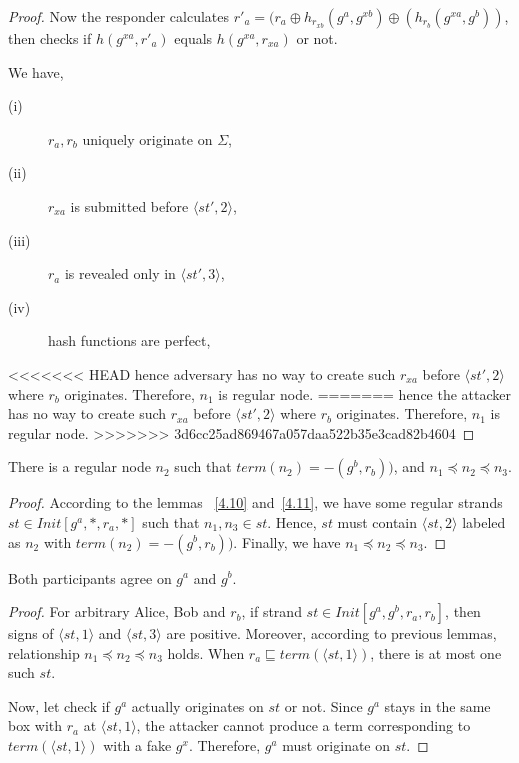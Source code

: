 \begin{itemize}
\begin{proof}
Now the responder calculates $r'_{a} = (r_a \oplus h_{r_{xb}}(g^a,g^{xb}) \oplus (h_{r_b}(g^{xa},g^b))$, then checks if $h(g^{xa},r'_{a})$ equals $h(g^{xa},r_{xa})$ or not. 

We have,
\begin{description} 
 \item [(i)] $r_a, r_b$ uniquely originate on $\Sigma$, 
 \item [(ii)] $r_{xa}$ is submitted before $\langle st',2\rangle$, 
 \item [(iii)] $r_{a}$ is revealed only in $\langle st',3 \rangle$, 
 \item [(iv)] hash functions are perfect, 
\end{description}
<<<<<<< HEAD
hence adversary has no way to create such $r_{xa}$ before $\langle st',2 \rangle$ where $r_b$ originates. Therefore, $n_1$ is regular node. 
=======
hence the attacker has no way to create such $r_{xa}$ before $\langle st',2 \rangle$ where $r_b$ originates. Therefore, $n_1$ is regular node. 
>>>>>>> 3d6cc25ad869467a057daa522b35e3cad82b4604
 \end{proof}

\begin{Lemma}\label{4.12}
There is a regular node $n_2$ such that $term(n_2)= -(g^b,r_b))$, and $n_1 \preceq n_2 \preceq n_3$.
\end{Lemma}

\begin{proof}
According to the lemmas ~\ref{4.10} and~\ref{4.11}, we have some regular strands $st \in Init[g^a,*, r_a,*]$ such that $n_1, n_3 \in st$. 
Hence, $st$ must contain $\langle st,2 \rangle$ labeled as $n_2$ with $term(n_2)= -(g^b,r_b))$. Finally, we have $n_1 \preceq n_2 \preceq n_3$.
\end{proof}

\begin{Lemma}\label{lemme4.13}
Both participants agree on $g^a$ and $g^b$. 
\end{Lemma}

\begin{proof}
For arbitrary Alice, Bob and $r_b$, if strand $st \in Init[g^a,g^b,r_a,r_b]$, then signs of $\langle st,1 \rangle$ and $\langle st,3 \rangle$ are positive. Moreover, according to previous lemmas, relationship $n_1 \preceq n_2 \preceq n_3$ holds. When $r_a \sqsubseteq term(\langle st,1 \rangle )$, there is at most one such $st$.

Now, let check if $g^a$ actually originates on $st$ or not. Since $g^a$ stays in the same box with $r_a$ at $\langle st,1 \rangle$, the attacker cannot produce a term corresponding to $term(\langle st,1 \rangle )$ with a fake $g^{x}$. Therefore, $g^a$ must originate on $st$. 


\end{proof}
\end{itemize}
